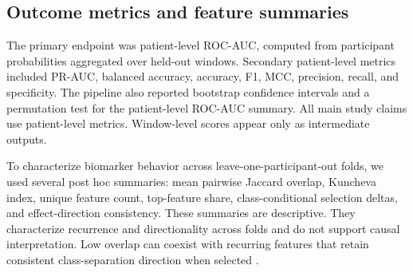 \subsection{Outcome metrics and feature summaries}

The primary endpoint was patient-level ROC-AUC, computed from participant probabilities aggregated over held-out windows. Secondary patient-level metrics included PR-AUC, balanced accuracy, accuracy, F1, MCC, precision, recall, and specificity. The pipeline also reported bootstrap confidence intervals and a permutation test for the patient-level ROC-AUC summary. All main study claims use patient-level metrics. Window-level scores appear only as intermediate outputs.

To characterize biomarker behavior across leave-one-participant-out folds, we used several post hoc summaries: mean pairwise Jaccard overlap, Kuncheva index, unique feature count, top-feature share, class-conditional selection deltas, and effect-direction consistency. These summaries are descriptive. They characterize recurrence and directionality across folds and do not support causal interpretation. Low overlap can coexist with recurring features that retain consistent class-separation direction when selected \citep{olbrich2013_eeg,olbrich2015_personalized,simmatis2023_technical}.
